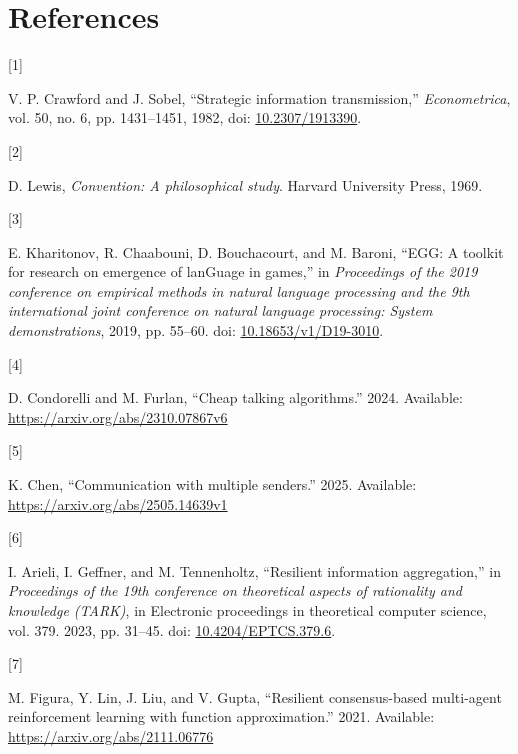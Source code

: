 \documentclass[
  12pt,
]{article}
\newlength{\cslhangindent}
\newlength{\csllabelwidth}
\newenvironment{CSLReferences}[2] %
 {\begin{list}{}{%
  \setlength{\itemindent}{0pt}
  \setlength{\leftmargin}{0pt}
  \setlength{\parsep}{0pt}
  \ifodd #1
   \setlength{\leftmargin}{\cslhangindent}
   \setlength{\itemindent}{-1\cslhangindent}
  \fi
  \setlength{\itemsep}{#2\baselineskip}}}
 {\end{list}}
\newcommand{\CSLLeftMargin}[1]{\parbox[t]{\csllabelwidth}{\strut#1\strut}}
\newcommand{\CSLRightInline}[1]{\parbox[t]{\linewidth - \csllabelwidth}{\strut#1\strut}}
\begin{document}
\FloatBarrier

\section*{References}\label{references}

\protect{}\label{refs}
\begin{CSLReferences}{0}{0}
\CSLLeftMargin{{[}1{]} }%
\CSLRightInline{V. P. Crawford and J. Sobel, {``Strategic information
transmission,''} \emph{Econometrica}, vol. 50, no. 6, pp. 1431--1451,
1982, doi: \href{https://doi.org/10.2307/1913390}{10.2307/1913390}.}

\CSLLeftMargin{{[}2{]} }%
\CSLRightInline{D. Lewis, \emph{Convention: A philosophical study}.
Harvard University Press, 1969.}

\CSLLeftMargin{{[}3{]} }%
\CSLRightInline{E. Kharitonov, R. Chaabouni, D. Bouchacourt, and M.
Baroni, {``{EGG}: A toolkit for research on emergence of lanGuage in
games,''} in \emph{Proceedings of the 2019 conference on empirical
methods in natural language processing and the 9th international joint
conference on natural language processing: System demonstrations}, 2019,
pp. 55--60. doi:
\href{https://doi.org/10.18653/v1/D19-3010}{10.18653/v1/D19-3010}.}

\CSLLeftMargin{{[}4{]} }%
\CSLRightInline{D. Condorelli and M. Furlan, {``Cheap talking
algorithms.''} 2024. Available:
\url{https://arxiv.org/abs/2310.07867v6}}

\CSLLeftMargin{{[}5{]} }%
\CSLRightInline{K. Chen, {``Communication with multiple senders.''}
2025. Available: \url{https://arxiv.org/abs/2505.14639v1}}

\CSLLeftMargin{{[}6{]} }%
\CSLRightInline{I. Arieli, I. Geffner, and M. Tennenholtz, {``Resilient
information aggregation,''} in \emph{Proceedings of the 19th conference
on theoretical aspects of rationality and knowledge (TARK)}, in
Electronic proceedings in theoretical computer science, vol. 379. 2023,
pp. 31--45. doi:
\href{https://doi.org/10.4204/EPTCS.379.6}{10.4204/EPTCS.379.6}.}

\CSLLeftMargin{{[}7{]} }%
\CSLRightInline{M. Figura, Y. Lin, J. Liu, and V. Gupta, {``Resilient
consensus-based multi-agent reinforcement learning with function
approximation.''} 2021. Available:
\url{https://arxiv.org/abs/2111.06776}}


\end{CSLReferences}
\end{document}
